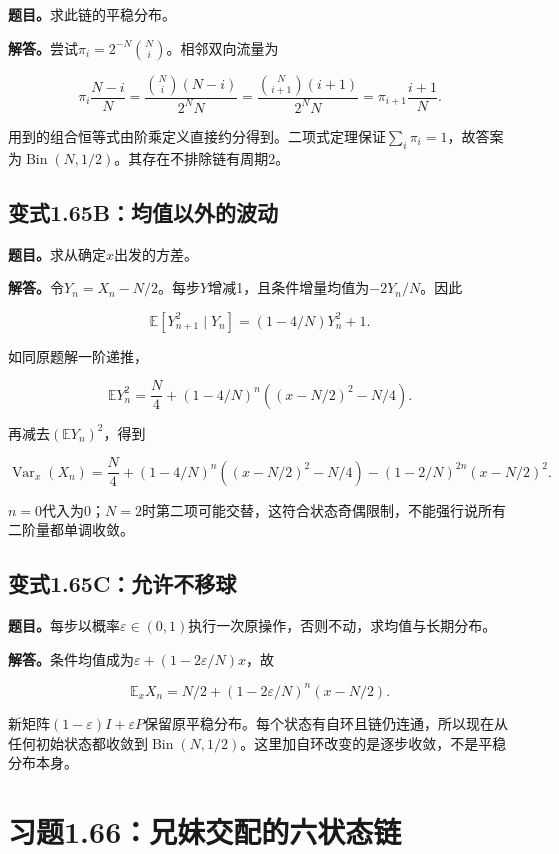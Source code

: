 \documentclass[
  11pt,a4paper,UTF8,fontset=fandol]{ctexart}
\begin{document}
\textbf{题目。}求此链的平稳分布。

\textbf{解答。}尝试\(\pi_i=2^{-N}\binom Ni\)。相邻双向流量为

\[\pi_i\frac{N-i}{N}=\frac{\binom Ni(N-i)}{2^NN}
=\frac{\binom N{i+1}(i+1)}{2^NN}=\pi_{i+1}\frac{i+1}{N}.\]

用到的组合恒等式由阶乘定义直接约分得到。二项式定理保证\(\sum_i\pi_i=1\)，故答案为\(\operatorname{Bin}(N,1/2)\)。其存在不排除链有周期2。

\subsection{变式1.65B：均值以外的波动}\label{ux53d8ux5f0f1.65bux5747ux503cux4ee5ux5916ux7684ux6ce2ux52a8}

\textbf{题目。}求从确定\(x\)出发的方差。

\textbf{解答。}令\(Y_n=X_n-N/2\)。每步\(Y\)增减1，且条件增量均值为\(-2Y_n/N\)。因此

\[\mathbb E[Y_{n+1}^2\mid Y_n]=(1-4/N)Y_n^2+1.\]

如同原题解一阶递推，

\[\mathbb EY_n^2=\frac N4+(1-4/N)^n\left((x-N/2)^2-N/4\right).\]

再减去\((\mathbb EY_n)^2\)，得到

\[
\boxed{\operatorname{Var}_x(X_n)=\frac N4+(1-4/N)^n\left((x-N/2)^2-N/4\right)
-(1-2/N)^{2n}(x-N/2)^2.}
\]

\(n=0\)代入为0；\(N=2\)时第二项可能交替，这符合状态奇偶限制，不能强行说所有二阶量都单调收敛。

\subsection{变式1.65C：允许不移球}\label{ux53d8ux5f0f1.65cux5141ux8bb8ux4e0dux79fbux7403}

\textbf{题目。}每步以概率\(\varepsilon\in(0,1)\)执行一次原操作，否则不动，求均值与长期分布。

\textbf{解答。}条件均值成为\(\varepsilon+(1-2\varepsilon/N)x\)，故

\[\mathbb E_xX_n=N/2+(1-2\varepsilon/N)^n(x-N/2).\]

新矩阵\((1-\varepsilon)I+\varepsilon P\)保留原平稳分布。每个状态有自环且链仍连通，所以现在从任何初始状态都收敛到\(\operatorname{Bin}(N,1/2)\)。这里加自环改变的是逐步收敛，不是平稳分布本身。

\section{习题1.66：兄妹交配的六状态链}\label{ux4e60ux98981.66ux5144ux59b9ux4ea4ux914dux7684ux516dux72b6ux6001ux94fe}
\end{document}
